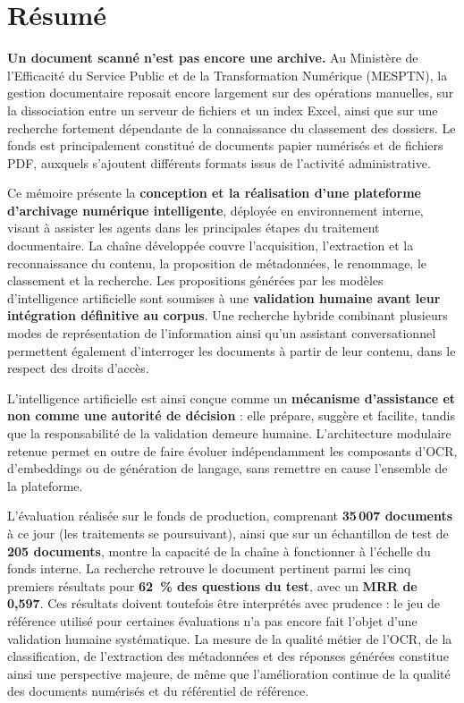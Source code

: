 \documentclass[12pt,a4paper]{report}
\newcommand{\nomMinistere}{Ministère de l'Efficacité du Service Public et de la Transformation Numérique (MESPTN)}
\begin{document}
\chapter*{Résumé}
\begingroup
{}
\setlength{\parskip}{0.38em}
\vspace{-1.1em}
\textbf{Un document scanné n'est pas encore une archive.} Au \nomMinistere{}, la gestion documentaire reposait encore largement sur des opérations manuelles, sur la dissociation entre un serveur de fichiers et un index Excel, ainsi que sur une recherche fortement dépendante de la connaissance du classement des dossiers. Le fonds est principalement constitué de documents papier numérisés et de fichiers PDF, auxquels s'ajoutent différents formats issus de l'activité administrative.

Ce mémoire présente la \textbf{conception et la réalisation d'une plateforme d'archivage numérique intelligente}, déployée en environnement interne, visant à assister les agents dans les principales étapes du traitement documentaire. La chaîne développée couvre l'acquisition, l'extraction et la reconnaissance du contenu, la proposition de métadonnées, le renommage, le classement et la recherche. Les propositions générées par les modèles d'intelligence artificielle sont soumises à une \textbf{validation humaine avant leur intégration définitive au corpus}. Une recherche hybride combinant plusieurs modes de représentation de l'information ainsi qu'un assistant conversationnel permettent également d'interroger les documents à partir de leur contenu, dans le respect des droits d'accès.

L'intelligence artificielle est ainsi conçue comme un \textbf{mécanisme d'assistance et non comme une autorité de décision} : elle prépare, suggère et facilite, tandis que la responsabilité de la validation demeure humaine. L'architecture modulaire retenue permet en outre de faire évoluer indépendamment les composants d'OCR, d'embeddings ou de génération de langage, sans remettre en cause l'ensemble de la plateforme.

L'évaluation réalisée sur le fonds de production, comprenant \textbf{35\,007 documents} à ce jour (les traitements se poursuivant), ainsi que sur un échantillon de test de \textbf{205 documents}, montre la capacité de la chaîne à fonctionner à l'échelle du fonds interne. La recherche retrouve le document pertinent parmi les cinq premiers résultats pour \textbf{62~\% des questions du test}, avec un \textbf{MRR de 0,597}. Ces résultats doivent toutefois être interprétés avec prudence : le jeu de référence utilisé pour certaines évaluations n'a pas encore fait l'objet d'une validation humaine systématique. La mesure de la qualité métier de l'OCR, de la classification, de l'extraction des métadonnées et des réponses générées constitue ainsi une perspective majeure, de même que l'amélioration continue de la qualité des documents numérisés et du référentiel de référence.
\end{document}
